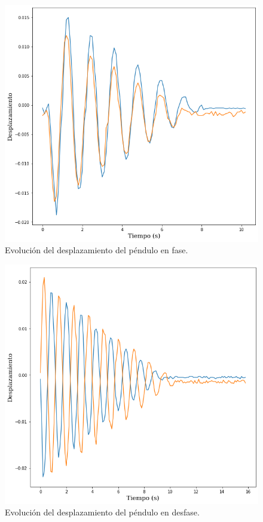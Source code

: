 \documentclass[10pt]{article}
\begin{document}
        \begin{figure}[H]
            \centering
            \includegraphics[scale = 0.3]{img/diagrama_fase.png}
            \caption{Evolución del desplazamiento del péndulo en fase.}
        \end{figure}

        \begin{figure}[H]
            \centering
            \includegraphics[scale = 0.3]{img/digrama_desfase.png}
            \caption{Evolución del desplazamiento del péndulo en desfase.}
        \end{figure}
 
\end{document}
